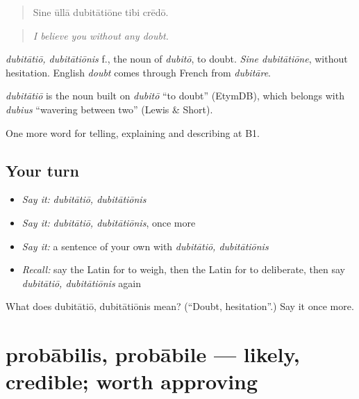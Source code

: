 \begin{quote}
Sine ūllā dubitātiōne tibi crēdō.
\end{quote}

\begin{quote}
\emph{I believe you without any doubt.}
\end{quote}

\emph{dubitātiō, dubitātiōnis} f., the noun of \emph{dubitō}, to doubt. \emph{Sine dubitātiōne}, without hesitation. English \emph{doubt} comes through French from \emph{dubitāre}.

\begin{cousinweb}
\emph{dubitātiō} is the noun built on \emph{dubitō} \textquotedblleft{}to doubt\textquotedblright{} (EtymDB), which belongs with \emph{dubius} \textquotedblleft{}wavering between two\textquotedblright{} (Lewis \& Short).
\end{cousinweb}

\begin{grammarlens}[title={What you've built}]
One more word for telling, explaining and describing at B1.
\end{grammarlens}

\subsection*{Your turn}
\begin{itemize}
\raggedright
  \item \emph{Say it:} \emph{dubitātiō, dubitātiōnis}
  \item \emph{Say it:} \emph{dubitātiō, dubitātiōnis}, once more
  \item \emph{Say it:} a sentence of your own with \emph{dubitātiō, dubitātiōnis}
  \item \emph{Recall:} say the Latin for to weigh, then the Latin for to deliberate, then say \emph{dubitātiō, dubitātiōnis} again
\end{itemize}

\begin{tcolorbox}[breakable,colback=teal!4,colframe=teal!35!black,title={Before you move on}]
What does dubitātiō, dubitātiōnis mean? (\textquotedblleft{}Doubt, hesitation\textquotedblright{}.) Say it once more.
\end{tcolorbox}
\section[probābilis, probābile]{probābilis, probābile — likely, credible; worth approving}

